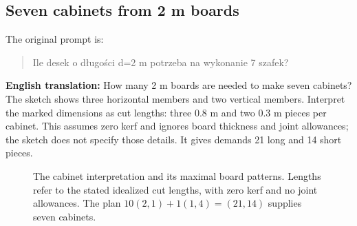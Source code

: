 \documentclass[11pt,a4paper]{article}
\begin{document}
\subsection{Seven cabinets from 2 m boards}
The original prompt is:
\begin{otherlanguage}{polish}
  \begin{quote}
    Ile desek o długości d=2 m potrzeba na wykonanie 7 szafek?
  \end{quote}
\end{otherlanguage}
\textbf{English translation:} How many 2 m boards are needed to make seven cabinets?
The sketch shows three horizontal members and two vertical members. Interpret
the marked dimensions as cut lengths: three 0.8 m and two 0.3 m pieces per cabinet.
This assumes zero kerf and ignores board thickness and joint allowances; the
sketch does not specify those details. It gives demands 21 long and 14 short pieces.

\begin{figure}[H]
  \centering
  \caption{The cabinet interpretation and its maximal board patterns.
    Lengths refer to the stated idealized cut lengths, with zero kerf and no joint
    allowances. The plan $10(2,1)+1(1,4)=(21,14)$ supplies seven cabinets.}
  \label{fig:cabinet}
\end{figure}
\end{document}
